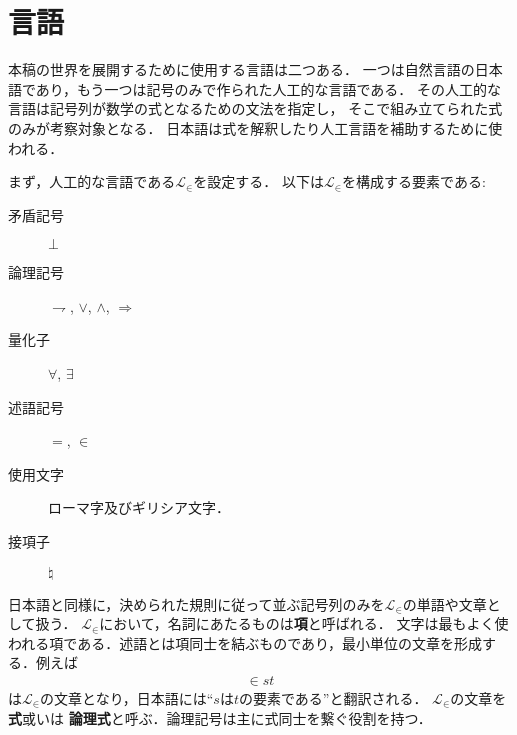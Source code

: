 \section{言語}
	本稿の世界を展開するために使用する言語は二つある．
	一つは自然言語の日本語であり，もう一つは記号のみで作られた人工的な言語である．
	その人工的な言語は記号列が数学の式となるための文法を指定し，
	そこで組み立てられた式のみが考察対象となる．
	日本語は式を解釈したり人工言語を補助するために使われる．
	
	まず，人工的な言語である$\mathcal{L}_{\in}$を設定する．
	以下は$\mathcal{L}_{\in}$を構成する要素である:
	\begin{description}
		\item[矛盾記号] $\bot$
		\item[論理記号] $\rightharpoondown$, $\vee$, $\wedge$, $\Longrightarrow$
		\item[量化子] $\forall$, $\exists$
		\item[述語記号] $=$, $\in$
		\item[使用文字] ローマ字及びギリシア文字．
		\item[接項子] $\natural$
	\end{description}
	
	日本語と同様に，決められた規則に従って並ぶ記号列のみを$\mathcal{L}_{\in}$の単語や文章として扱う．
	$\mathcal{L}_{\in}$において，名詞にあたるものは{\bf 項}と呼ばれる．
	文字は最もよく使われる項である．述語とは項同士を結ぶものであり，最小単位の文章を形成する．例えば
	\begin{align}
		\in st
	\end{align}
	は$\mathcal{L}_{\in}$の文章となり，日本語には``$s$は$t$の要素である''と翻訳される．
	$\mathcal{L}_{\in}$の文章を{\bf 式}或いは
	{\bf 論理式}と呼ぶ．論理記号は主に式同士を繋ぐ役割を持つ．
	
